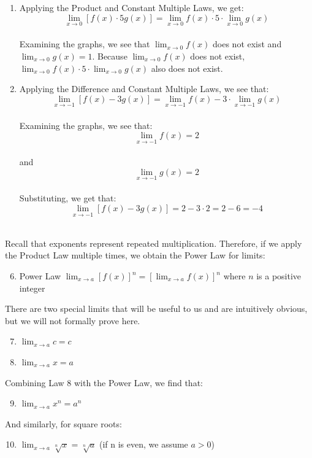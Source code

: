 \begin{Answer}
\begin{enumerate}
        From the graph, we see that: 
        $$\lim_{x\to-1}f(x) = 2$$\\
        and 
        $$\lim_{x\to-1}g(x) = 2$$\\ 
        Substituting, we get: 
        $$\lim_{x\to-1} \left[\frac{3g(x)}{f(x)}\right]=\frac{3 \cdot 2}{2}=3$$\\
        \item Applying the Product and Constant Multiple Laws, we get: 
        $$\lim_{x\to0}\left[f(x) \cdot 5g(x)\right] = \lim_{x\to0}f(x) \cdot 5 \cdot \lim_{x\to0}g(x)$$\\
        Examining the graphs, we see that $\lim_{x\to0}f(x)$ does not exist and 
        $\lim_{x\to0}g(x) = 1$. Because $\lim_{x\to0}f(x)$ does not exist, 
        $\lim_{x\to0}f(x) \cdot 5 \cdot \lim_{x\to0}g(x)$ also does not exist. 
        \item Applying the Difference and Constant Multiple Laws, we see that: 
        $$\lim_{x\to-1} \left[f(x) - 3g(x)\right] =\lim_{x\to-1}f(x) - 3 \cdot \lim_{x\to-1}g(x)$$ \\
        Examining the graphs, we see that: 
        $$\lim_{x\to-1}f(x) = 2$$\\ 
        and 
        $$\lim_{x\to-1}g(x) = 2$$\\ 
        Substituting, we get that: 
        $$\lim_{x\to-1} \left[f(x) - 3g(x)\right] =2 - 3 \cdot 2 = 2-6 = -4$$\\
    \end{enumerate}
\end{Answer}


Recall that exponents represent repeated multiplication. Therefore, if we apply the 
Product Law multiple times, we obtain the Power Law for limits:
\begin{enumerate}
    \setcounter{enumi}{5}
    \item Power Law $\lim_{x \to a} \left[ f(x) \right]^n = \left[
    \lim_{x \to a} f(x) \right]^n$ where $n$ is a positive integer
\end{enumerate}
There are two special limits that will be useful to us and are intuitively 
obvious, but we will not formally prove here.  
\begin{enumerate}
    \setcounter{enumi}{6}
    \item $\lim_{x\to a} \textit{c} = \textit{c}$
    \item $\lim_{x\to a} x = a$
\end{enumerate}
Combining Law 8 with the Power Law, we find that:
\begin{enumerate}
\setcounter{enumi}{8}
    \item $\lim_{x\to a} x^n = a^n$
\end{enumerate}
And similarly, for square roots:
\begin{enumerate}
    \setcounter{enumi}{9}
    \item $\lim_{x\to a} \sqrt[n]{x} = \sqrt[n]{a}$ (if n is even, we assume $a > 0$)
\end{enumerate}

